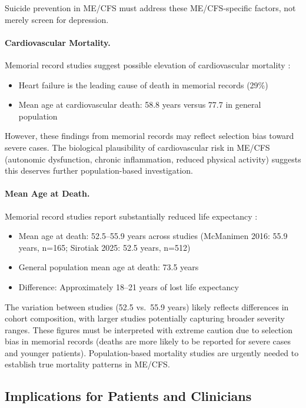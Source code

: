 Suicide prevention in ME/CFS must address these ME/CFS-specific factors, not merely screen for depression.

\paragraph{Cardiovascular Mortality.}
Memorial record studies suggest possible elevation of cardiovascular mortality \cite{McManimen2016, Sirotiak2025}:
\begin{itemize}
    \item Heart failure is the leading cause of death in memorial records (29\%)
    \item Mean age at cardiovascular death: 58.8 years versus 77.7 in general population
\end{itemize}

However, these findings from memorial records may reflect selection bias toward severe cases. The biological plausibility of cardiovascular risk in ME/CFS (autonomic dysfunction, chronic inflammation, reduced physical activity) suggests this deserves further population-based investigation.

\paragraph{Mean Age at Death.}
Memorial record studies report substantially reduced life expectancy \cite{McManimen2016, Sirotiak2025}:
\begin{itemize}
    \item Mean age at death: 52.5--55.9 years across studies (McManimen 2016: 55.9 years, n=165; Sirotiak 2025: 52.5 years, n=512)
    \item General population mean age at death: 73.5 years
    \item Difference: Approximately 18--21 years of lost life expectancy
\end{itemize}

The variation between studies (52.5 vs.\ 55.9 years) likely reflects differences in cohort composition, with larger studies potentially capturing broader severity ranges. These figures must be interpreted with extreme caution due to selection bias in memorial records (deaths are more likely to be reported for severe cases and younger patients). Population-based mortality studies are urgently needed to establish true mortality patterns in ME/CFS.

\subsection{Implications for Patients and Clinicians}

